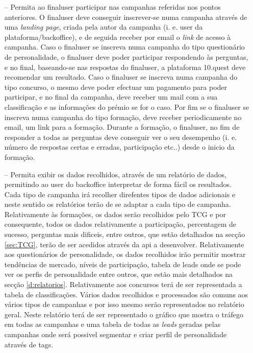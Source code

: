 \begin{itemize}
	\item[--] Permita ao \gls{finaluser} participar nas campanhas referidas nos pontos anteriores. O \gls{finaluser} deve conseguir inscrever-se numa campanha através de uma \textit{landing page}, criada pela autor da campanha (i. e. \gls{user} da plataforma/\gls{backoffice}), e de seguida receber por email o \textit{link} de acesso à campanha. Caso o \gls{finaluser} se inscreva numa campanha do tipo questionário de personalidade, o \gls{finaluser}  deve poder participar respondendo às perguntas, e no final, baseando-se nas respostas do \gls{finaluser}, a plataforma 10.quest deve recomendar um resultado. Caso o \gls{finaluser} se inscreva numa campanha do tipo concurso, o mesmo deve poder efectuar um pagamento para poder participar, e no final da campanha, deve receber um mail com a sua classificação e as informações do prémio se for o caso. Por fim se o \gls{finaluser} se inscreva numa campanha do tipo formação, deve receber periodicamente no email, um link para a formação. Durante a formação, o \gls{finaluser}, no fim de responder a todas as perguntas deve conseguir ver o seu desempenho (i. e. número de respostas certas e erradas, participação etc..) desde o inicio da formação.
	\item[--] Permita exibir os dados recolhidos, através de um relatório de dados, permitindo ao \gls{user} do \gls{backoffice} interpretar de forma fácil os resultados. Cada tipo de campanha irá recolher direfentes tipos de dados adicionais e neste sentido os relatórios terão de se adaptar a cada tipo de campanha. Relativamente às formações, os dados serão recolhidos pelo TCG e por consequente, todos os dados relativamente a participação, percentagem de sucesso, perguntas mais dificeis, entre outros, que estão detalhados na secção \ref{sec:TCG}, terão de ser acedidos através da \acrshort{api} a desenvolver. Relativamente aos questionários de personalidade, os dados recolhidos irão permitir mostrar tendências de mercado, níveis de participação, tabela de leads onde se pode ver os perfis de personalidade entre outros, que estão mais detalhados na secção \ref{d:relatorios}. Relativamente aos concursos terá de ser representada a tabela de classificações. Vários dados recolhidos e processados são comuns aos vários tipos de campanhas e por isso mesmo serão representados no relatório geral. Neste relatório terá de ser representado o gráfico que mostra o tráfego em todas as campanhas e uma tabela de todas as \textit{leads} geradas pelas campanhas onde será possivel segmentar e criar perfil de personalidade através de \gls{tags}.
\end{itemize}



